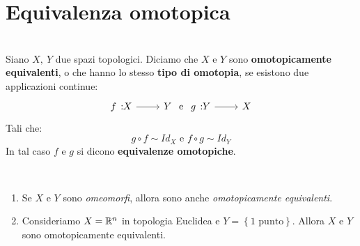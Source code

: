 \section{Equivalenza omotopica}
\begin{define}~{}\\
	Siano $X,\ Y$ due spazi topologici. Diciamo che $X$ e $Y$ sono \textbf{omotopicamente equivalenti}, o che hanno lo stesso \textbf{tipo di omotopia}, se esistono due applicazioni continue:
	\begin{equation}
		\funz{f}{X}{Y}\text{ e }\funz{g}{Y}{X}
	\end{equation}
Tali che:
\begin{equation}
	g\circ f\sim Id_X\text{ e }f\circ g\sim Id_Y
\end{equation}
In tal caso $f$ e $g$ si dicono \textbf{equivalenze omotopiche}.
\end{define}
\begin{observes}~{}
\begin{enumerate}
	\item Se $X$ e $Y$ sono \textit{omeomorfi}, allora sono anche \textit{omotopicamente equivalenti}.
	\item Consideriamo $X=\mathbb{R}^n$ in topologia Euclidea e $Y=\left\{1\text{ punto}\right\}$. Allora $X$ e $Y$ sono omotopicamente equivalenti.
\end{enumerate}
\vspace{-3mm}
\end{observes}
